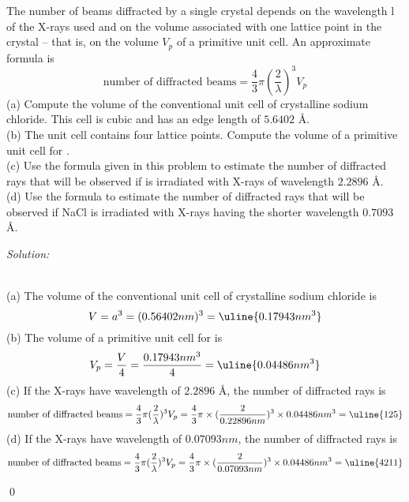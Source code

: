 \documentclass[12pt]{article}
\newenvironment{problem}[2][Problem]{\begin{trivlist}
\item[\hskip \labelsep {\bfseries #1}\hskip \labelsep {\bfseries #2.}]}{\end{trivlist}}
\newenvironment{sol}
    {\emph{Solution:}
    }
    {
    \qed
    }
\begin{document}
\begin{problem}{21.45}
The number of beams diffracted by a single crystal depends on the wavelength l of the X-rays used and on the volume associated with one lattice point in the crystal -- that is, on the volume $V_p$ of a primitive unit cell. An approximate formula is
\[
\text{number of diffracted beams}=\frac{4}{3}\pi(\frac{2}{\lambda})^3V_p
\]
(a) Compute the volume of the conventional unit cell of crystalline sodium chloride. This cell is cubic and has an edge length of $5.6402$ \AA.\\
(b) The  unit cell contains four lattice points. Compute the volume of a primitive unit cell for .\\
(c) Use the formula given in this problem to estimate the number of diffracted rays that will be observed if  is irradiated with X-rays of wavelength $2.2896$ \AA.\\
(d) Use the formula to estimate the number of diffracted rays that will be observed if NaCl is irradiated with X-rays having the shorter wavelength $0.7093$ \AA.
\end{problem}
\begin{sol}
\\(a) The volume of the conventional unit cell of crystalline sodium chloride is
\[
V=a^3=(0.56402nm)^3=\uline{0.17943nm^3}
\]
(b) The volume of a primitive unit cell for  is
\[
V_p=\frac{V}{4}=\frac{0.17943nm^3}{4}=\uline{0.04486nm^3}
\]
(c) If the X-rays have wavelength of $2.2896$ \AA, the number of diffracted rays is
\[
\text{number of diffracted beams}=\frac{4}{3}\pi(\frac{2}{\lambda})^3V_p=\frac{4}{3}\pi\times(\frac{2}{0.22896nm})^3\times0.04486nm^3=\uline{125}
\]
(d) If the X-rays have wavelength of $0.07093nm$, the number of diffracted rays is
\[
\text{number of diffracted beams}=\frac{4}{3}\pi(\frac{2}{\lambda})^3V_p=\frac{4}{3}\pi\times(\frac{2}{0.07093nm})^3\times0.04486nm^3=\uline{4211}
\]
\end{sol}
\end{document}
